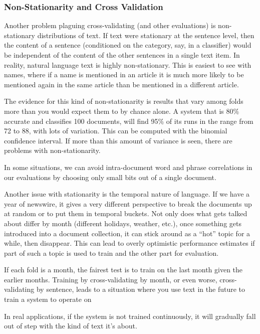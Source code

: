 \subsubsection{Non-Stationarity and Cross Validation}

Another problem plaguing cross-validating (and other evaluations) is
non-stationary distributions of text.  If text were stationary at the
sentence level, then the content of a sentence (conditioned on the
category, say, in a classifier) would be independent of the content of
the other sentences in a single text item.  In reality, natural
language text is highly non-stationary.  This is easiest to see with
names, where if a name is mentioned in an article it is much more
likely to be mentioned again in the same article than be mentioned in
a different article.  

The evidence for this kind of non-stationarity is results that vary
among folds more than you would expect them to by chance alone.  A
system that is 80\% accurate and classifies 100 documents, will find
95\% of its runs in the range from 72 to 88, with lots of variation.
This can be computed with the binomial confidence interval.  If more
than this amount of variance is seen, there are problems with
non-stationarity.

In some situations, we can avoid intra-document word and phrase
correlations in our evaluations by choosing only small bits out
of a single document.  

Another issue with stationarity is the temporal nature of language.
If we have a year of newswire, it gives a very different perspective
to break the documents up at random or to put them in temporal
buckets.  Not only does what gets talked about differ by month
(different holidays, weather, etc.), once something gets introduced
into a document collection, it can stick around as a ``hot'' topic for
a while, then disappear.  This can lead to overly optimistic
performance estimates if part of such a topic is used to train and
the other part for evaluation.  

If each fold is a month, the fairest test is to train on the
last month given the earlier months.  Training by cross-validating by
month, or even worse, cross-validating by sentence, leads to a situation
where you use text in the future to train a system to operate on

In real applications, if the system is not trained continuously, it
will gradually fall out of step with the kind of text it's about.


